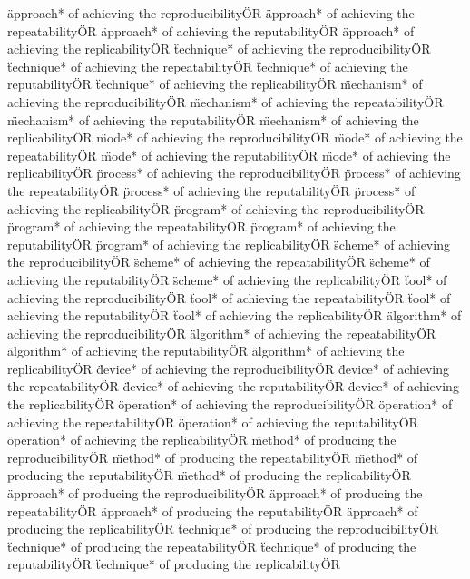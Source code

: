 \documentclass[
10pt, %
a4paper, %
oneside, %
headinclude,footinclude, %
BCOR5mm, %
]{scrartcl}
\begin{document}
\"approach* of achieving the reproducibility\" OR \"approach* of achieving the repeatability\" OR \"approach* of achieving the reputability\" OR \"approach* of achieving the replicability\" OR 
\"technique* of achieving the reproducibility\" OR \"technique* of achieving the repeatability\" OR \"technique* of achieving the reputability\" OR \"technique* of achieving the replicability\" OR 
\"mechanism* of achieving the reproducibility\" OR \"mechanism* of achieving the repeatability\" OR \"mechanism* of achieving the reputability\" OR \"mechanism* of achieving the replicability\" OR 
\"mode* of achieving the reproducibility\" OR \"mode* of achieving the repeatability\" OR \"mode* of achieving the reputability\" OR \"mode* of achieving the replicability\" OR 
\"process* of achieving the reproducibility\" OR \"process* of achieving the repeatability\" OR \"process* of achieving the reputability\" OR \"process* of achieving the replicability\" OR 
\"program* of achieving the reproducibility\" OR \"program* of achieving the repeatability\" OR \"program* of achieving the reputability\" OR \"program* of achieving the replicability\" OR 
\"scheme* of achieving the reproducibility\" OR \"scheme* of achieving the repeatability\" OR \"scheme* of achieving the reputability\" OR \"scheme* of achieving the replicability\" OR 
\"tool* of achieving the reproducibility\" OR \"tool* of achieving the repeatability\" OR \"tool* of achieving the reputability\" OR \"tool* of achieving the replicability\" OR 
\"algorithm* of achieving the reproducibility\" OR \"algorithm* of achieving the repeatability\" OR \"algorithm* of achieving the reputability\" OR \"algorithm* of achieving the replicability\" OR 
\"device* of achieving the reproducibility\" OR \"device* of achieving the repeatability\" OR \"device* of achieving the reputability\" OR \"device* of achieving the replicability\" OR 
\"operation* of achieving the reproducibility\" OR \"operation* of achieving the repeatability\" OR \"operation* of achieving the reputability\" OR \"operation* of achieving the replicability\" OR 
\"method* of producing the reproducibility\" OR \"method* of producing the repeatability\" OR \"method* of producing the reputability\" OR \"method* of producing the replicability\" OR 
\"approach* of producing the reproducibility\" OR \"approach* of producing the repeatability\" OR \"approach* of producing the reputability\" OR \"approach* of producing the replicability\" OR 
\"technique* of producing the reproducibility\" OR \"technique* of producing the repeatability\" OR \"technique* of producing the reputability\" OR \"technique* of producing the replicability\" OR 
\end{document}
